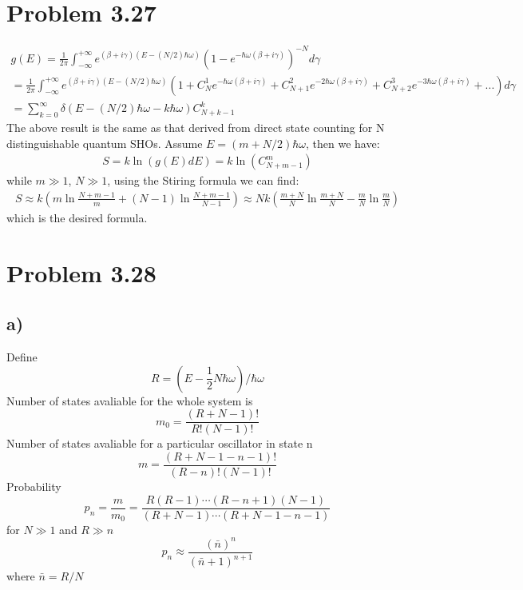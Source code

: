 \documentclass{article}
\begin{document}
\section*{Problem 3.27}
\begin{eqnarray*}
g(E)=\frac{1}{2 \pi}\int_{-\infty}^{+\infty} e^{(\beta +i\gamma)(E-(N/2)\hbar\omega)}(1-e^{-\hbar\omega(\beta +i\gamma)})^{-N}d\gamma  \qquad \qquad \qquad \qquad \qquad \qquad \qquad \qquad \qquad \quad\\
=\frac{1}{2 \pi}\int_{-\infty}^{+\infty} e^{(\beta +i\gamma)(E-(N/2)\hbar\omega)}(1+C_N^1e^{-\hbar\omega(\beta +i\gamma)}+C_{N+1}^2e^{-2\hbar\omega(\beta +i\gamma)}+C_{N+2}^3e^{-3\hbar\omega(\beta +i\gamma)}+...)d\gamma  \\
=\sum_{k=0}^{\infty}\delta(E-(N/2)\hbar\omega-k\hbar\omega)C_{N+k-1}^{k}  \qquad \qquad \qquad \qquad \qquad \qquad \qquad \qquad \qquad \qquad \qquad \qquad \qquad
\end{eqnarray*}
The above result is the same as that derived from direct state counting for N distinguishable quantum SHOs. Assume $ E=(m+N/2)\hbar\omega $, then we have:
\begin{eqnarray*}
S=k\ln(g(E)dE)=k\ln(C_{N+m-1}^m)
\end{eqnarray*}
while $m\gg1$, $N\gg1$, using the Stiring formula we can find:
\begin{eqnarray*}
S\approx k(m\ln{\frac{N+m-1}{m}}+(N-1)\ln{\frac{N+m-1}{N-1}})\approx Nk(\frac{m+N}{N}\ln{\frac{m+N}{N}}-\frac{m}{N}\ln{\frac{m}{N}})
\end{eqnarray*}
which is the desired formula.
\section*{Problem 3.28}
\subsection*{a)}
Define
\begin{equation*}
R=\left(E-\frac{1}{2}N\hbar\omega\right)\Bigg/\hbar\omega
\end{equation*}
Number of states avaliable for the whole system is
\begin{equation*}
m_0=\frac{(R+N-1)!}{R!(N-1)!}
\end{equation*}
Number of states avaliable for a particular oscillator in state n
\begin{equation*}
m=\frac{(R+N-1-n-1)!}{(R-n)!(N-1)!}
\end{equation*}
Probability
\begin{equation*}
p_n=\frac{m}{m_0}=\frac{R(R-1)\cdots(R-n+1)(N-1)}{(R+N-1)\cdots(R+N-1-n-1)}
\end{equation*}
for $N\gg 1$ and $R\gg n$
\begin{equation*}
p_n\approx \frac{(\bar n)^n}{(\bar n+1)^{n+1}}
\end{equation*}
where $\bar n=R/N$
\end{document}
